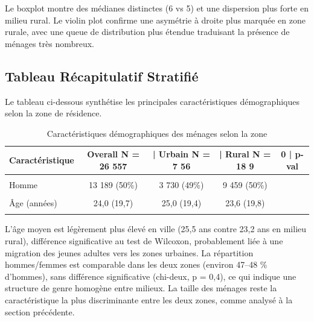 \documentclass[
  11pt,
]{article}
\begin{document}
Le boxplot montre des médianes distinctes (6 vs 5) et une dispersion
plus forte en milieu rural. Le violin plot confirme une asymétrie à
droite plus marquée en zone rurale, avec une queue de distribution plus
étendue traduisant la présence de ménages très nombreux.

\subsection{Tableau Récapitulatif
Stratifié}\label{tableau-ruxe9capitulatif-stratifiuxe9}

Le tableau ci-dessous synthétise les principales caractéristiques
démographiques selon la zone de résidence.

\begingroup\fontsize{10}{12}\selectfont

\begin{longtable}[t]{lcccc}
\caption{\label{tab:tab_recap}Caractéristiques démographiques des ménages selon la zone}\\
\toprule
Caractéristique & Overall
N = 26 557 & | Urbain
N = 7 56 & | Rural
N = 18 9 & 0 | p-val\\
\midrule
\cellcolor{gray!10}{Sexe} & \cellcolor{gray!10}{} & \cellcolor{gray!10}{} & \cellcolor{gray!10}{} & \cellcolor{gray!10}{}\\
\hspace{1em}Homme & 13 189 (50\%) & 3 730 (49\%) & 9 459 (50\%) & \\
\hspace{1em}\cellcolor{gray!10}{Femme} & \cellcolor{gray!10}{13 368 (50\%)} & \cellcolor{gray!10}{3 837 (51\%)} & \cellcolor{gray!10}{9 531 (50\%)} & \cellcolor{gray!10}{}\\
Âge (années) & 24,0 (19,7) & 25,0 (19,4) & 23,6 (19,8) & \\
\cellcolor{gray!10}{Taille du ménage} & \cellcolor{gray!10}{7 (5, 10)} & \cellcolor{gray!10}{6 (5, 9)} & \cellcolor{gray!10}{8 (5, 11)} & \cellcolor{gray!10}{}\\
\bottomrule
\end{longtable}
\endgroup{}

L'âge moyen est légèrement plus élevé en ville (25,5 ans contre 23,2 ans
en milieu rural), différence significative au test de Wilcoxon,
probablement liée à une migration des jeunes adultes vers les zones
urbaines. La répartition hommes/femmes est comparable dans les deux
zones (environ 47--48 \% d'hommes), sans différence significative
(chi-deux, p = 0,4), ce qui indique une structure de genre homogène
entre milieux. La taille des ménages reste la caractéristique la plus
discriminante entre les deux zones, comme analysé à la section
précédente.
\end{document}
